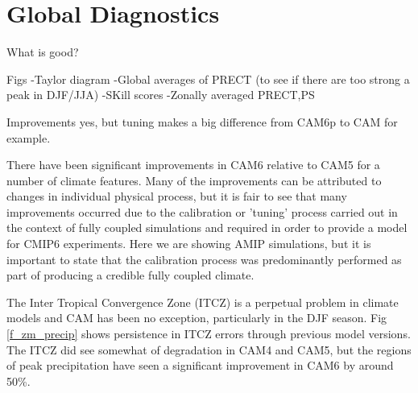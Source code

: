 \section{Global Diagnostics}
What is good?

Figs
-Taylor diagram
-Global averages of PRECT (to see if there are too strong a peak in DJF/JJA)
-SKill scores
-Zonally averaged PRECT,PS

Improvements yes, but tuning makes a big difference from CAM6p to CAM for example.

There have been significant improvements in CAM6 relative to CAM5 for a number of climate features. Many of the improvements can be attributed to changes in individual physical process, but it is fair to see that many improvements occurred due to the calibration or 'tuning' process carried out in the context of fully coupled simulations and required in order to provide a model for CMIP6 experiments. Here we are showing AMIP simulations, but it is important to state that the calibration process was predominantly performed as part of producing a credible fully coupled climate. 

The Inter Tropical Convergence Zone (ITCZ) is a perpetual problem in climate models and CAM has been no exception, particularly in the DJF season. Fig \ref{f_zm_precip} shows persistence in ITCZ errors through previous model versions. The ITCZ did see somewhat of degradation in CAM4 and CAM5, but the regions of peak precipitation have seen a significant improvement in CAM6 by around 50\%. 

